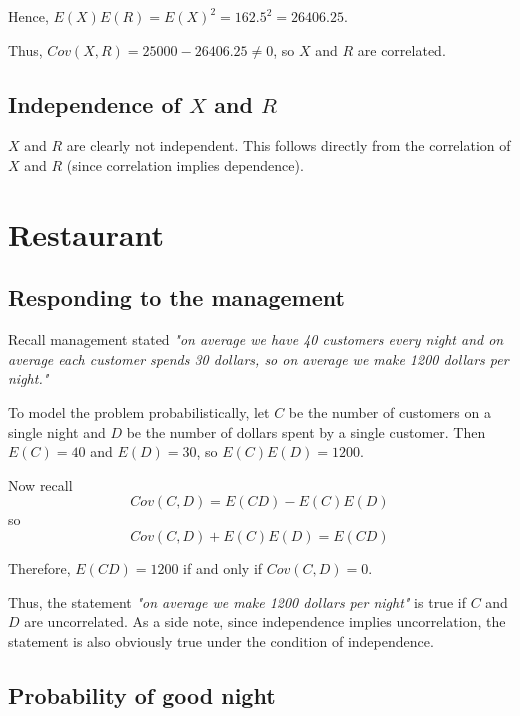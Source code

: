 \documentclass[paper=a4, fontsize=11pt]{scrartcl} %
\numberwithin{equation}{section} %
\numberwithin{figure}{section} %
\numberwithin{table}{section} %
\begin{document}
Hence, $E(X)E(R) = E(X)^2 = 162.5^2 = 26406.25$.

Thus, $Cov(X,R) = 25000 - 26406.25 \neq 0$, so $X$ and $R$ are correlated.

\subsection{Independence of $X$ and $R$}

$X$ and $R$ are clearly not independent. This follows directly from the correlation of $X$ and $R$ (since correlation implies dependence).


\section{Restaurant}

\subsection{Responding to the management}

Recall management stated \textit{"on average we have 40 customers every night and on average each customer spends 30 dollars, so on average we make 1200 dollars per night."}

To model the problem probabilistically, let $C$ be the number of customers on a single night and $D$ be the number of dollars spent by a single customer. Then $E(C) = 40$ and $E(D) = 30$, so $E(C)E(D) = 1200$.

Now recall
\begin{equation*}
Cov(C,D) = E(CD) - E(C)E(D)
\end{equation*}
so
\begin{equation*}
Cov(C,D) + E(C)E(D) = E(CD)
\end{equation*}

Therefore, $E(CD) = 1200$ if and only if $Cov(C,D) = 0$.

Thus, the statement \textit{"on average we make 1200 dollars per night"} is true if $C$ and $D$ are uncorrelated. As a side note, since independence implies uncorrelation, the statement is also obviously true under the condition of independence.

\subsection{Probability of good night}
\end{document}
